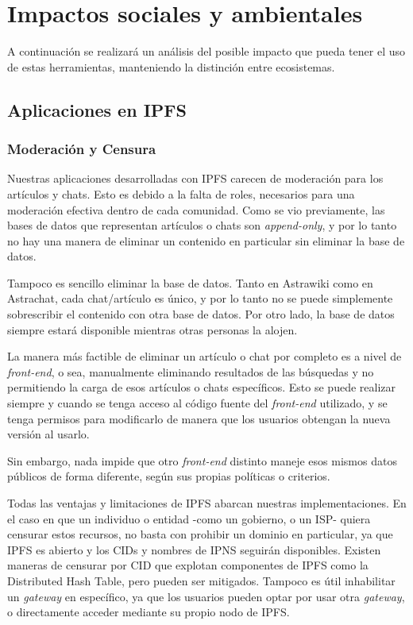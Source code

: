 \section{Impactos sociales y ambientales}

A continuación se realizará un análisis del posible impacto que pueda tener el uso de estas herramientas, manteniendo la distinción entre ecosistemas.

\subsection{Aplicaciones en IPFS}

\subsubsection{Moderación y Censura}

Nuestras aplicaciones desarrolladas con IPFS carecen de moderación para los artículos y chats. Esto es debido a la falta de roles, necesarios para una moderación efectiva dentro de cada comunidad. Como se vio previamente, las bases de datos que representan artículos o chats son \textit{append-only}, y por lo tanto no hay una manera de eliminar un contenido en particular sin eliminar la base de datos.

Tampoco es sencillo eliminar la base de datos. Tanto en Astrawiki como en Astrachat, cada chat/artículo es único, y por lo tanto no se puede simplemente sobrescribir el contenido con otra base de datos. Por otro lado, la base de datos siempre estará disponible mientras otras personas la alojen.

La manera más factible de eliminar un artículo o chat por completo es a nivel de \textit{front-end}, o sea, manualmente eliminando resultados de las búsquedas y no permitiendo la carga de esos artículos o chats específicos. Esto se puede realizar siempre y cuando se tenga acceso al código fuente del \textit{front-end} utilizado, y se tenga permisos para modificarlo de manera que los usuarios obtengan la nueva versión al usarlo.

Sin embargo, nada impide que otro \textit{front-end} distinto maneje esos mismos datos públicos de forma diferente, según sus propias políticas o criterios.

Todas las ventajas y limitaciones de IPFS abarcan nuestras implementaciones. En el caso en que un individuo o entidad -como un gobierno, o un ISP- quiera censurar estos recursos, no basta con prohibir un dominio en particular, ya que IPFS es abierto y los CIDs y nombres de IPNS seguirán disponibles. Existen maneras de censurar por CID que explotan componentes de IPFS como la Distributed Hash Table, pero pueden ser mitigados. \cite{censorship-ipfs} Tampoco es útil inhabilitar un \textit{gateway} en específico, ya que los usuarios pueden optar por usar otra \textit{gateway}, o directamente acceder mediante su propio nodo de IPFS.

